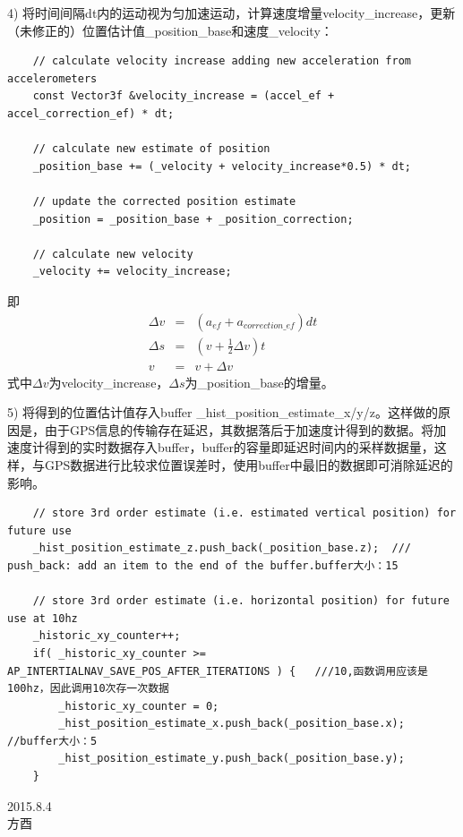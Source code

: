 \documentclass[a4paper,10pt]{ctexart} %
\begin{document}
4) 将时间间隔dt内的运动视为匀加速运动，计算速度增量velocity\_increase，更新（未修正的）位置估计值\_position\_base和速度\_velocity：
\begin{lstlisting}
    // calculate velocity increase adding new acceleration from accelerometers
    const Vector3f &velocity_increase = (accel_ef + accel_correction_ef) * dt;

    // calculate new estimate of position
    _position_base += (_velocity + velocity_increase*0.5) * dt;

    // update the corrected position estimate
    _position = _position_base + _position_correction;

    // calculate new velocity
    _velocity += velocity_increase;
\end{lstlisting}
即
\begin{eqnarray}
\Delta v	&=&	(a_{ef}+a_{correction\_ef})dt\\ \nonumber
\Delta s	&=&	(v+\frac{1}{2}\Delta v)t\\ \nonumber
v			&=&	v+\Delta v
\end{eqnarray}
式中$\Delta v$为velocity\_increase，$\Delta s$为\_position\_base的增量。

5) 将得到的位置估计值存入buffer \_hist\_position\_estimate\_x/y/z。这样做的原因是，由于GPS信息的传输存在延迟，其数据落后于加速度计得到的数据。将加速度计得到的实时数据存入buffer，buffer的容量即延迟时间内的采样数据量，这样，与GPS数据进行比较求位置误差时，使用buffer中最旧的数据即可消除延迟的影响。
\begin{lstlisting}
    // store 3rd order estimate (i.e. estimated vertical position) for future use
    _hist_position_estimate_z.push_back(_position_base.z);  /// push_back: add an item to the end of the buffer.buffer大小：15

    // store 3rd order estimate (i.e. horizontal position) for future use at 10hz
    _historic_xy_counter++;
    if( _historic_xy_counter >= AP_INTERTIALNAV_SAVE_POS_AFTER_ITERATIONS ) {   ///10,函数调用应该是100hz，因此调用10次存一次数据
        _historic_xy_counter = 0;
        _hist_position_estimate_x.push_back(_position_base.x); 	//buffer大小：5
        _hist_position_estimate_y.push_back(_position_base.y);
    }

\end{lstlisting}



\begin{flushright}
\vspace{30pt}
2015.8.4\\
方酉
\end{flushright}
\end{document}
